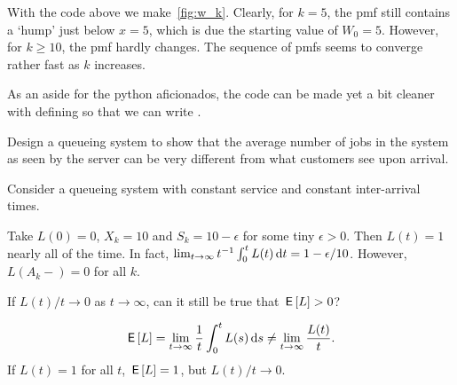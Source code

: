 With the code above we make~\cref{fig:w_k}.
Clearly, for $k=5$, the pmf still contains a `hump' just below $x=5$, which is due the starting value of $W_{0}=5$.
However, for $k\geq 10$, the pmf hardly changes.
The sequence of pmfs seems to converge rather fast as $k$ increases.

As an aside for the python aficionados, the code can be made yet a bit cleaner with defining   so that we can write
.





\begin{exercise}\label{ex:l-165}
Design a queueing system to show that the average number of jobs in the system as seen by the server can be very different from what customers see upon arrival.
\begin{hint}
Consider a queueing system with constant service and constant inter-arrival times.
\end{hint}
\begin{solution}
 Take $L(0) = 0$, $X_k = 10$ and $S_k = 10-\epsilon$ for some tiny
 $\epsilon>0$. Then $L(t) = 1$ nearly all of the time. In fact,
 $\lim_{t\to\infty}t^{-1}\int_0^t L(t) \,\textrm{d}t= 1-\epsilon/10$. However, $L(A_k-)=0$ for all $k$.
\end{solution}
\end{exercise}


\begin{exercise}\label{ex:90}
 If $L(t)/t \to 0$ as $t\to\infty$, can it still be true that $\,\mathsf{E}\left[L\right]>0$?
\begin{solution}
 \begin{equation*}
 \,\mathsf{E}\left[L\right] = \lim_{t\to\infty} \frac 1 t \int_0^t L(s) \,\textrm{d}s \neq \lim_{t\to\infty} \frac{L(t)}t.
 \end{equation*}
If $L(t)=1$ for all $t$, $\,\mathsf{E}\left[L\right] =1 $, but $L(t)/t \to 0$.
\end{solution}
\end{exercise}


